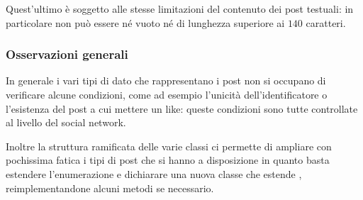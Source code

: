 Quest'ultimo è soggetto alle stesse limitazioni del contenuto dei post testuali: in particolare non può essere né vuoto né di lunghezza superiore ai $140$ caratteri.

\subsubsection*{Osservazioni generali}

In generale i vari tipi di dato che rappresentano i post non si occupano di verificare alcune condizioni, come ad esempio l'unicità dell'identificatore o l'esistenza del post a cui mettere un like: queste condizioni sono tutte controllate al livello del social network.

Inoltre la struttura ramificata delle varie classi ci permette di ampliare con pochissima fatica i tipi di post che si hanno a disposizione in quanto basta estendere l'enumerazione  e dichiarare una nuova classe che estende , reimplementandone alcuni metodi se necessario.